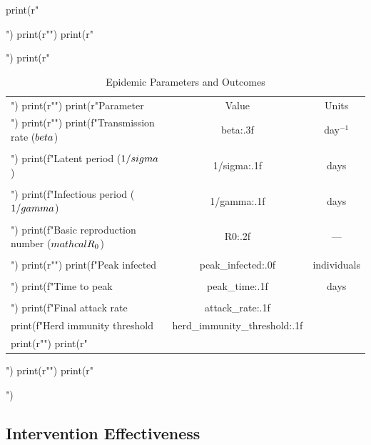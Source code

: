\documentclass[a4paper, 11pt]{article}
\begin{document}
\begin{pycode}
print(r"\begin{table}[htbp]")
print(r"\centering")
print(r"\caption{Epidemic Parameters and Outcomes}")
print(r"\begin{tabular}{lcc}")
print(r"\toprule")
print(r"Parameter & Value & Units \\")
print(r"\midrule")
print(f"Transmission rate ($\\beta$) & {beta:.3f} & day$^{{-1}}$ \\\\")
print(f"Latent period ($1/\\sigma$) & {1/sigma:.1f} & days \\\\")
print(f"Infectious period ($1/\\gamma$) & {1/gamma:.1f} & days \\\\")
print(f"Basic reproduction number ($\\mathcal{{R}}_0$) & {R0:.2f} & --- \\\\")
print(r"\midrule")
print(f"Peak infected & {peak_infected:.0f} & individuals \\\\")
print(f"Time to peak & {peak_time:.1f} & days \\\\")
print(f"Final attack rate & {attack_rate:.1f} & \\%
print(f"Herd immunity threshold & {herd_immunity_threshold:.1f} & \\%
print(r"\bottomrule")
print(r"\end{tabular}")
print(r"\label{tab:epidemic_params}")
print(r"\end{table}")
\end{pycode}

\subsection{Intervention Effectiveness}
\end{document}
